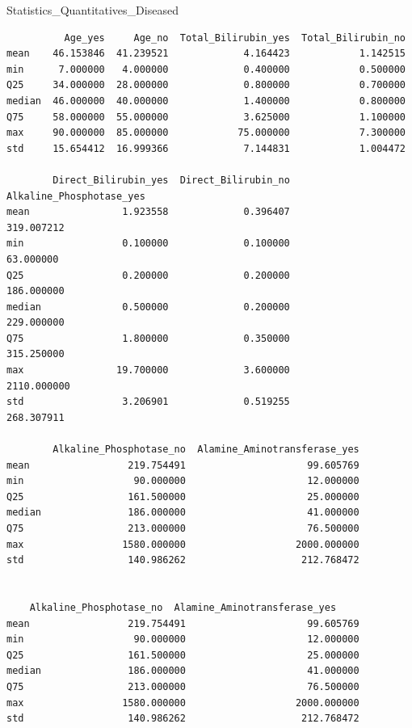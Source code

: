 \documentclass[
  11pt,
  a4paper,
]{article}
\newenvironment{Shaded}{\begin{snugshade}}{\end{snugshade}}
\newcommand{\NormalTok}[1]{#1}
\begin{document}
\newpage

\begin{Shaded}
\begin{Highlighting}[]
\NormalTok{Statistics\_Quantitatives\_Diseased}
\end{Highlighting}
\end{Shaded}

\begin{verbatim}
          Age_yes     Age_no  Total_Bilirubin_yes  Total_Bilirubin_no  
mean    46.153846  41.239521             4.164423            1.142515   
min      7.000000   4.000000             0.400000            0.500000   
Q25     34.000000  28.000000             0.800000            0.700000   
median  46.000000  40.000000             1.400000            0.800000   
Q75     58.000000  55.000000             3.625000            1.100000   
max     90.000000  85.000000            75.000000            7.300000   
std     15.654412  16.999366             7.144831            1.004472   

        Direct_Bilirubin_yes  Direct_Bilirubin_no  Alkaline_Phosphotase_yes  
mean                1.923558             0.396407                319.007212   
min                 0.100000             0.100000                 63.000000   
Q25                 0.200000             0.200000                186.000000   
median              0.500000             0.200000                229.000000   
Q75                 1.800000             0.350000                315.250000   
max                19.700000             3.600000               2110.000000   
std                 3.206901             0.519255                268.307911   

        Alkaline_Phosphotase_no  Alamine_Aminotransferase_yes  
mean                 219.754491                     99.605769   
min                   90.000000                     12.000000   
Q25                  161.500000                     25.000000   
median               186.000000                     41.000000   
Q75                  213.000000                     76.500000   
max                 1580.000000                   2000.000000   
std                  140.986262                    212.768472 


    Alkaline_Phosphotase_no  Alamine_Aminotransferase_yes  
mean                 219.754491                     99.605769   
min                   90.000000                     12.000000   
Q25                  161.500000                     25.000000   
median               186.000000                     41.000000   
Q75                  213.000000                     76.500000   
max                 1580.000000                   2000.000000   
std                  140.986262                    212.768472   


\end{verbatim}
\end{document}
